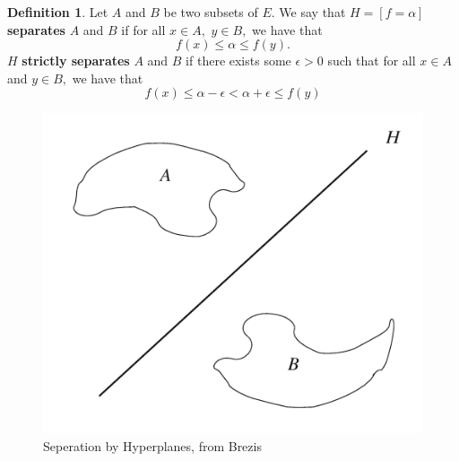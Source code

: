 \documentclass[10pt, oneside]{article}
\theoremstyle{definition}
\newtheorem{defn}{Definition}
\begin{document}
\begin{defn}
    Let $A$ and $B$ be two subsets of $E.$ We say that $H = [f = \alpha]$ \textbf{separates} $A$ and $B$ if for all $x\in A,$ $y\in B,$ we have that
    \[f(x) \leq \alpha \leq f(y).\] $H$ \textbf{strictly separates} $A$ and $B$ if there exists some $\epsilon>0$ such that for all $x\in A$ and $y\in B,$ we have that
    \[f(x) \leq \alpha - \epsilon < \alpha + \epsilon \leq f(y)\]
\end{defn}
\begin{figure}[H]
    \centering
    \includegraphics[width=0.5\linewidth]{Images/Seperation by Hyperplanes.png}
    \caption{Seperation by Hyperplanes, from Brezis}
\end{figure}
\end{document}
